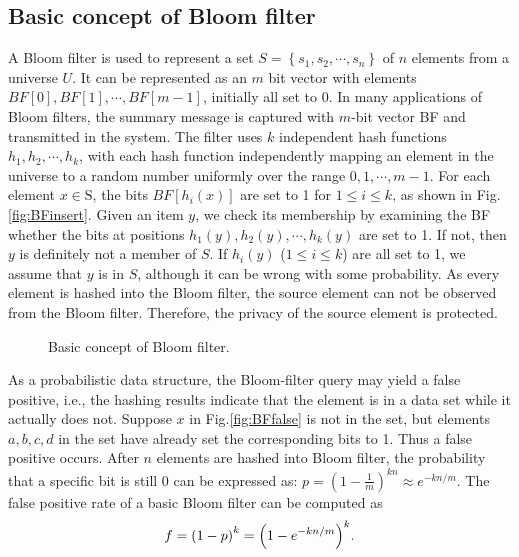 \documentclass[10pt,journal,compsoc]{IEEEtran}
\newcommand{\rev}[1]{#1}
\begin{document}
\subsection{Basic concept of Bloom filter}
\label{subsec:Basic concept of Bloom filter}
A Bloom filter is used to represent a set $S = \left\{ {{s_1},{s_2}, \cdots ,{s_n}} \right\}$ of $n$ elements from a universe $U$. It can be represented as an $m$ bit vector with elements $BF[0],BF[1], \cdots ,BF\left[ {m - 1} \right]$, initially all set to 0.
In many applications of Bloom filters, the summary message is captured with $m$-bit vector BF and transmitted in the system.
The filter uses $k$ independent hash functions $h_1,h_2, \cdots ,h_k$, with each hash function independently mapping an element in the universe to a random number uniformly over the range ${0,1, \cdots ,m-1}$. For each element ${x} \in {\text{S}}$, the bits $BF[h_i(x)]$ are set to 1 for $1 \le i \le k$, as shown in Fig.\ref{fig:BFinsert}. Given an item $y$, we check its membership by examining the BF whether the bits at positions $h_1(y),h_2(y), \cdots ,h_k(y)$ are set to 1.  If not, then $y$ is definitely not a member of $S$.  If $h_i(y)$ ($1 \le i \le k$) are all set to 1, we assume that $y$ is in $S$, although it can be wrong with some probability. %
As every element is hashed into the Bloom filter, the source element can not be observed from the Bloom filter. Therefore, the privacy of the source element is protected.
\begin{figure}[!h]
\centering
{}
\caption{Basic concept of Bloom filter.}
\label{fig:Operations on basic bloom filter}
\end{figure}

As a probabilistic data structure, the Bloom-filter query may yield a false positive, i.e., the hashing results indicate that the element is in a data set while it actually does not. Suppose $x$ in Fig.\ref{fig:BFfalse} is not in the set, but elements $a, b, c, d$ in the set have already set the corresponding bits to 1. Thus a false positive occurs. After $n$ elements are hashed into Bloom filter, the probability that a specific bit is still 0 can be expressed as: $p = {\left( {1 - \frac{1}{m}} \right)^{kn}} \approx {e^{ - kn/m}}$. The false positive rate of a basic Bloom filter can be computed as
\begin{equation}
\footnotesize
f = {\left( {1 - p} \right)^k} = {\left( {1 - {e^{ - kn/m}}} \right)^k}.
\label{eq:false positive}
\end{equation}
\end{document}
